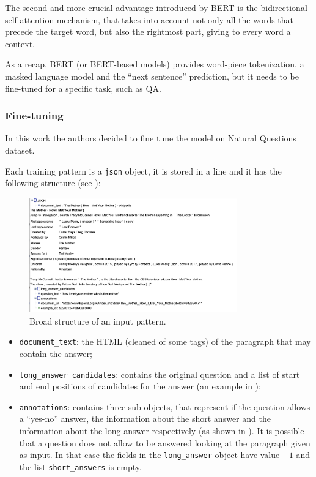 \documentclass[10pt,hidelinks]{article}
\begin{document}
The second and more crucial advantage introduced by BERT is the bidirectional self attention mechanism, that takes into account not only all the words that precede the target word, but also the rightmost part, giving to every word a context.





As a recap, BERT (or BERT-based models) provides word-piece tokenization, a masked language model and  the ``next sentence'' prediction, but it needs to be fine-tuned for a specific task, such as QA.

\subsubsection{Fine-tuning}\label{subsubsec:finetuning}
In this work the authors decided to fine tune the model on Natural Questions dataset.

Each training pattern is a \texttt{json} object, it is stored in a line and it has the following structure (see ):

\begin{figure}[ht!]
	\centering
	\includegraphics[width=0.8\textwidth]{pics/json.png}
	\caption{Broad structure of an input pattern.}\label{fig:json}
\end{figure}

\begin{itemize}
	\item {\tt document\_text}: the HTML (cleaned of some tags) of the paragraph that may contain the answer;
	\item {\tt long\_answer candidates}: contains the original question and a list of start and end positions of candidates for the answer (an example in );
	\item {\tt annotations}: contains three sub-objects, that represent if the question allows a ``yes-no'' answer, the information about the short answer and the information about the long answer respectively (as shown in ). It is possible that a question does not allow to be answered looking at the paragraph given as input. In that case the fields in the \texttt{long\_answer} object have value $-1$ and the list \texttt{short\_answers} is empty.
\end{itemize}
\end{document}
